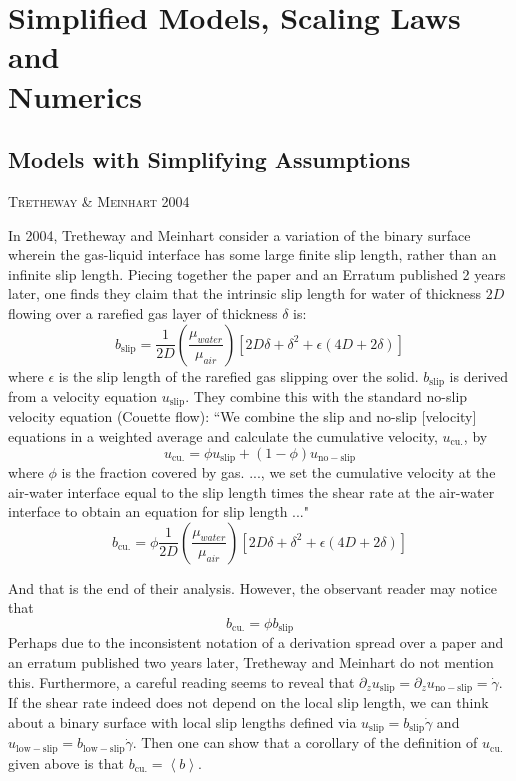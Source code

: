 \documentclass[12pt, a4paper, twoside, openright]{book}
\newcommand{\paper}[1]
         {\colorbox[gray]{0.8}{ \textsc{#1}}
         
         }
\begin{document}
\section{Simplified Models, Scaling Laws and\\ Numerics}

\subsection{Models with Simplifying Assumptions}

\paper{Tretheway \& Meinhart 2004}
In 2004, Tretheway and Meinhart \cite{TrethewayMeinhart2004} consider a variation of the binary surface wherein the gas-liquid interface has some large finite slip length, rather than an infinite slip length.  Piecing together the paper and an Erratum \cite{TrethewayMeinhartErratum2004} published 2 years later, one finds they claim that the intrinsic slip length for water of thickness $2D$ flowing over a rarefied gas layer of thickness $\delta$ is:
\begin{equation}
b_{\mathrm{slip}} = \frac{1}{2D} \left( \frac{\mu_{water}}{\mu_{air}} \right)
\left[ 2D\delta + \delta^2 + \epsilon(4D + 2\delta) \right]
\end{equation}
where $\epsilon$ is the slip length of the rarefied gas slipping over the solid.  $b_{\mathrm{slip}}$ is derived from a velocity equation $u_{\mathrm{slip}}$.  They combine this with the standard no-slip velocity equation (Couette flow):
``We combine the slip and no-slip [velocity] equations in a weighted average and calculate the cumulative velocity, $u_{\mathrm{cu.}}$, by
\begin{equation}
u_{\mathrm{cu.}} = \phi u_{\mathrm{slip}} + (1-\phi) u_{\mathrm{no-slip}}
\end{equation}
where $\phi$ is the fraction covered by gas. ..., we set the cumulative velocity at the air-water interface equal to the slip length times the shear rate at the air-water interface to obtain an equation for slip length ..."
\begin{equation}
b_{\mathrm{cu.}} = \phi \frac{1}{2D} \left( \frac{\mu_{water}}{\mu_{air}} \right)
 \left[ 2D\delta + \delta^2 + \epsilon(4D + 2\delta) \right]
\end{equation}

And that is the end of their analysis.  However, the observant reader may notice that
\begin{equation}
b_{\mathrm{cu.}} = \phi b_{\mathrm{slip}} 
\end{equation}
Perhaps due to the inconsistent notation of a derivation spread over a paper and an erratum published two years later, Tretheway and Meinhart do not mention this.
Furthermore, a careful reading seems to reveal that 
$ \partial_z u_{\mathrm{slip}} = \partial_z u_{\mathrm{no-slip}} = \dot{\gamma} $.
If the shear rate indeed does not depend on the local slip length, we can think about a binary surface with local slip lengths defined via $u_{\mathrm{slip}} = b_{\mathrm{slip}} \dot{\gamma}$ and $u_{\mathrm{low-slip}} = b_{\mathrm{low-slip}} \dot{\gamma}$.  Then one can show that a corollary of the definition of $u_{\mathrm{cu.}}$ given above is that $b_{\mathrm{cu.}} = \left< b \right>$.
\end{document}
